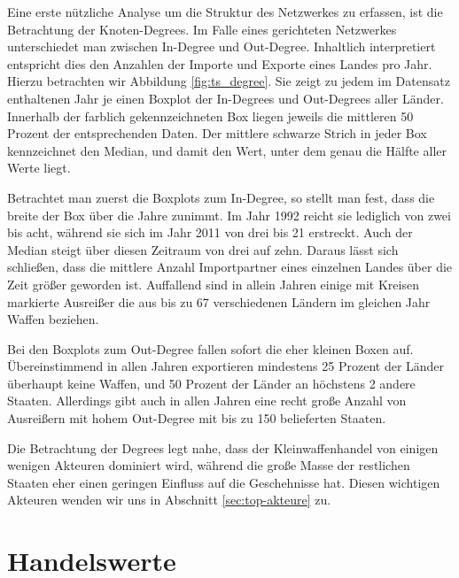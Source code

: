 \documentclass[a4paper,ngerman,oneside,titlepage,bibliography=totoc,11pt]{scrreprt}
\begin{document}
Eine erste nützliche Analyse um die Struktur des Netzwerkes zu erfassen, ist die Betrachtung der Knoten-Degrees. Im Falle eines gerichteten Netzwerkes unterschiedet man zwischen In-Degree und Out-Degree. Inhaltlich interpretiert entspricht dies den Anzahlen der Importe und Exporte eines Landes pro Jahr. Hierzu betrachten wir Abbildung \ref{fig:ts_degree}. Sie zeigt zu jedem im Datensatz enthaltenen Jahr je einen Boxplot der In-Degrees und Out-Degrees aller Länder. Innerhalb der farblich gekennzeichneten Box liegen jeweils die mittleren 50 Prozent der entsprechenden Daten. Der mittlere schwarze Strich in jeder Box kennzeichnet den Median, und damit den Wert, unter dem genau die Hälfte aller Werte liegt.

Betrachtet man zuerst die Boxplots zum In-Degree, so stellt man fest, dass die breite der Box über die Jahre zunimmt. Im Jahr 1992 reicht sie lediglich von zwei bis acht, während sie sich im Jahr 2011 von drei bis 21 erstreckt. Auch der Median steigt über diesen Zeitraum von drei auf zehn. Daraus lässt sich schließen, dass die mittlere Anzahl Importpartner eines einzelnen Landes über die Zeit größer geworden ist. Auffallend sind in allein Jahren einige mit Kreisen markierte Ausreißer
die aus bis zu 67 verschiedenen Ländern im gleichen Jahr Waffen beziehen.

Bei den Boxplots zum Out-Degree fallen sofort die eher kleinen Boxen auf. Übereinstimmend in allen Jahren exportieren mindestens 25 Prozent der Länder überhaupt keine Waffen, und 50 Prozent der Länder an höchstens 2 andere Staaten. Allerdings gibt auch in allen Jahren eine recht große Anzahl von Ausreißern mit hohem Out-Degree mit bis zu 150 belieferten Staaten. 

Die Betrachtung der Degrees legt nahe, dass der Kleinwaffenhandel von einigen wenigen Akteuren dominiert wird, während die große Masse der restlichen Staaten eher einen geringen Einfluss auf die Geschehnisse hat. Diesen wichtigen Akteuren wenden wir uns in Abschnitt \ref{sec:top-akteure} zu.

\section{Handelswerte}
\end{document}
